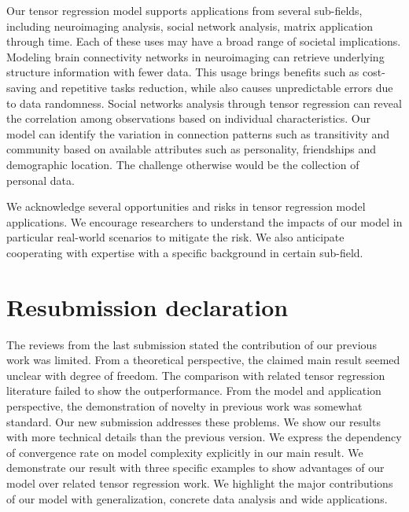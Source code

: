 \documentclass{article}
\theoremstyle{plain}
\theoremstyle{definition}
\begin{document}
Our tensor regression model supports applications from several sub-fields, including neuroimaging analysis, social network analysis, matrix application through time. Each of these uses may have a broad range of societal implications. Modeling brain connectivity networks in neuroimaging can retrieve underlying structure information with fewer data. This usage brings benefits such as cost-saving and repetitive tasks reduction, while also causes unpredictable errors due to data randomness. Social networks analysis through tensor regression can reveal the correlation among observations based on individual characteristics. Our model can identify the variation in connection patterns such as transitivity and community based on available attributes such as personality, friendships and demographic location. The challenge otherwise would be the collection of personal data. 

We acknowledge several opportunities and risks in tensor regression model applications. We encourage researchers to understand the impacts of our model in particular real-world scenarios to mitigate the risk. We also anticipate cooperating with expertise with a specific background in certain sub-field.






\section*{Resubmission declaration}
The reviews from the last submission stated the contribution of our previous work was limited. From a theoretical perspective, the claimed main result seemed unclear with degree of freedom. The comparison with related tensor regression literature failed to show the outperformance. From the model and application perspective, the demonstration of novelty in previous work was somewhat standard. Our new submission addresses these problems. We show our results with more technical details than the previous version.  We express the dependency of convergence rate on model complexity explicitly in our main result. We demonstrate our result with three specific examples to show advantages of our model over related tensor regression work. We highlight the major contributions of our model with generalization, concrete data analysis and wide applications.

\medskip



\end{document}
